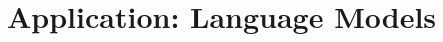 \documentclass[10pt]{beamer}
\begin{document}





\section{Application: Language Models}
\fi
\end{document}
